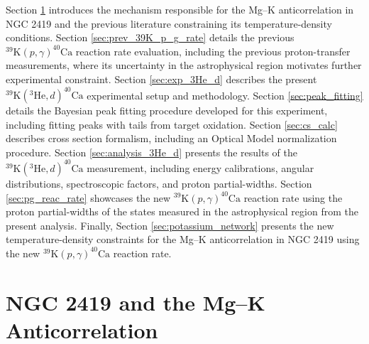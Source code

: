 Section \ref{sec:NGC2419} introduces the mechanism responsible for the Mg--K anticorrelation in NGC 2419 and the previous literature constraining its temperature-density conditions. Section \ref{sec:prev_39K_p_g_rate} details the previous $^{39}\mathrm{K}(p, \gamma)^{40}\mathrm{Ca}$ reaction rate evaluation, including the previous proton-transfer measurements, where its uncertainty in the astrophysical region motivates further experimental constraint. Section \ref{sec:exp_3He_d} describes the present $^{39}\mathrm{K}(^{3}\mathrm{He},d)^{40}\mathrm{Ca}$ experimental setup and methodology. Section \ref{sec:peak_fitting} details the Bayesian peak fitting procedure developed for this experiment, including fitting peaks with tails from target oxidation. Section \ref{sec:cs_calc} describes cross section formalism, including an Optical Model normalization procedure. Section \ref{sec:analysis_3He_d} presents the results of the $^{39}\mathrm{K}(^{3}\mathrm{He},d)^{40}\mathrm{Ca}$ measurement, including energy calibrations, angular distributions, spectroscopic factors, and proton partial-widths. Section \ref{sec:pg_reac_rate} showcases the new $^{39}\mathrm{K}(p, \gamma)^{40}\mathrm{Ca}$ reaction rate using the proton partial-widths of the states measured in the astrophysical region from the present analysis. Finally, Section \ref{sec:potassium_network} presents the new temperature-density constraints for the Mg--K anticorrelation in NGC 2419 using the new $^{39}\mathrm{K}(p, \gamma)^{40}\mathrm{Ca}$ reaction rate.

\section{NGC 2419 and the Mg--K Anticorrelation} \label{sec:NGC2419}




